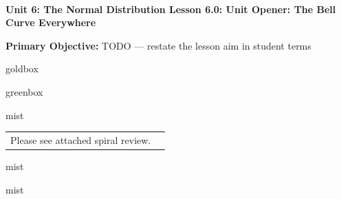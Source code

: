 \documentclass[10pt]{article}
\newcommand{\UnitNumberName}{Unit 6: The Normal Distribution \quad}
\newcommand{\LessonNumberName}{Lesson 6.0: Unit Opener: The Bell Curve Everywhere}
\begin{document}
\begin{center}
    {\Large\bfseries \CourseName \\
    {\small\bfseries \UnitNumberName \LessonNumberName}}
\end{center}

\begin{tcolorbox}[colback=mist, colframe=royal, boxrule=0.9pt, arc=2mm,
    left=2mm, right=2mm, top=1.5mm, bottom=1.5mm]
    \textbf{Primary Objective:} TODO --- restate the lesson aim in student terms
\end{tcolorbox}

\renewcommand{\arraystretch}{1.6}
\begin{skillbox}{goldbox}
\end{skillbox}

\begin{skillbox}{greenbox}
\end{skillbox}

\begin{fixedskillbox}{mist}
    \begin{tabularx}{\linewidth}{@{}X c@{}}
        \begin{minipage}[t]{0.55\linewidth}\vspace{0pt}
            Please see attached spiral review.  %
        \end{minipage}
        &
        \begin{minipage}[t]{0.38\linewidth}\vspace{0pt}\centering
        \end{minipage}
    \end{tabularx}
\end{fixedskillbox}

\begin{skillbox}[Hook]{mist}
\end{skillbox}

\begin{skillbox}[Lesson]{mist}
\end{skillbox}
\end{document}
